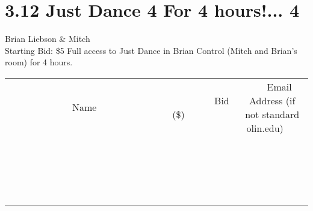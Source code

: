 \documentclass[11pt]{article}
\begin{document}
\section*{3.12 Just Dance 4 For 4 hours!... 4}
Brian Liebson \& Mitch
\\
Starting Bid: \$5
\newline
Full access to Just Dance in Brian Control (Mitch and Brian's room) for 4 hours.
\\[3ex]
\begin{tabular}{c c c}
~~~~~~~~~~~~~Name~~~~~~~~~~~~~ & ~~~~~~~~~Bid (\$)~~~~~~~~~  & ~~~Email Address (if not standard olin.edu)~~~\\
 & & \\
\hline
 & & \\
\hline
 & & \\
\hline
 & & \\
\hline
 & & \\
\hline
 & & \\
\hline
 & & \\
\hline
 & & \\
\hline
 & & \\
\hline
 & & \\
\hline
 & & \\
\hline
 & & \\
\hline
 & & \\
\hline
 & & \\
\hline
 & & \\
\hline
 & & \\
\hline
 & & \\
\hline
 & & \\
\hline
 & & \\
\hline
\end{tabular}
\newpage
\end{document}
